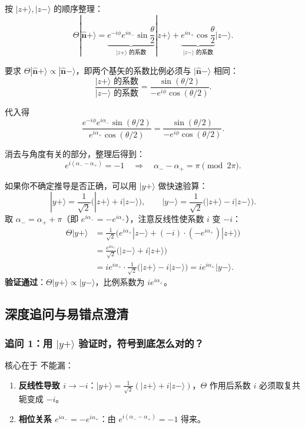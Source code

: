 按 $|z+\rangle, |z-\rangle$ 的顺序整理：
\[
\Theta |\hat{\bm{n}}+\rangle = \underbrace{e^{-i\phi} e^{i\alpha_-} \sin\frac{\theta}{2}}_{|z+\rangle\text{ 的系数}} |z+\rangle + \underbrace{e^{i\alpha_+} \cos\frac{\theta}{2}}_{|z-\rangle\text{ 的系数}} |z-\rangle.
\]

要求 $\Theta |\hat{\bm{n}}+\rangle \propto |\hat{\bm{n}}-\rangle$，即两个基矢的系数比例必须与 $|\hat{\bm{n}}-\rangle$ 相同：
\[
\frac{|z+\rangle\text{ 的系数}}{|z-\rangle\text{ 的系数}} = \frac{\sin(\theta/2)}{-e^{i\phi}\cos(\theta/2)}.
\]

代入得
\[
\frac{e^{-i\phi} e^{i\alpha_-} \sin(\theta/2)}{e^{i\alpha_+} \cos(\theta/2)} = \frac{\sin(\theta/2)}{-e^{i\phi}\cos(\theta/2)}.
\]

消去与角度有关的部分，整理后得到：
\[
\boxed{e^{i(\alpha_- - \alpha_+)} = -1} \quad\Longrightarrow\quad \boxed{\alpha_- - \alpha_+ = \pi \pmod{2\pi}}.
\]

\begin{tipbox}
如果你不确定推导是否正确，可以用 $|y+\rangle$ 做快速验算：
\[
|y+\rangle = \frac{1}{\sqrt{2}}\bigl(|z+\rangle + i|z-\rangle\bigr), \qquad |y-\rangle = \frac{1}{\sqrt{2}}\bigl(|z+\rangle - i|z-\rangle\bigr).
\]
取 $\alpha_- = \alpha_+ + \pi$（即 $e^{i\alpha_-} = -e^{i\alpha_+}$），注意反线性使系数 $i$ 变 $-i$：
\begin{align*}
\Theta |y+\rangle &= \frac{1}{\sqrt{2}}\bigl(e^{i\alpha_+}|z-\rangle + (-i) \cdot (-e^{i\alpha_+})|z+\rangle\bigr) \\
&= \frac{e^{i\alpha_+}}{\sqrt{2}}\bigl(|z-\rangle + i|z+\rangle\bigr) \\
&= i e^{i\alpha_+} \cdot \frac{1}{\sqrt{2}}\bigl(|z+\rangle - i|z-\rangle\bigr) = i e^{i\alpha_+} |y-\rangle.
\end{align*}
\textbf{验证通过}：$\Theta|y+\rangle \propto |y-\rangle$，比例系数为 $i e^{i\alpha_+}$。
\end{tipbox}

\subsection{深度追问与易错点澄清}

\subsubsection*{追问 1：用 $|y+\rangle$ 验证时，符号到底怎么对的？}

核心在于  不能漏：
\begin{enumerate}[nosep]
    \item \textbf{反线性导致 $i \to -i$}：$|y+\rangle = \frac{1}{\sqrt{2}}(|z+\rangle + i|z-\rangle)$，$\Theta$ 作用后系数 $i$ 必须取复共轭变成 $-i$。
    \item \textbf{相位关系 $e^{i\alpha_-} = -e^{i\alpha_+}$}：由 $e^{i(\alpha_--\alpha_+)}=-1$ 得来。
\end{enumerate}

